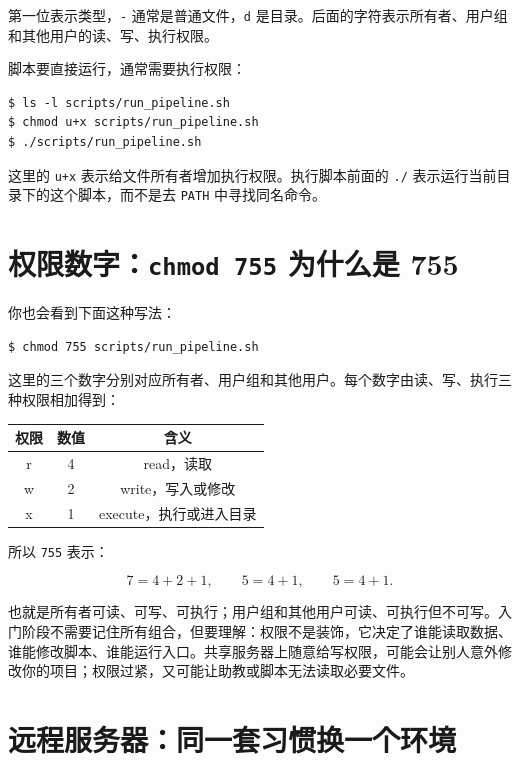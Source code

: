 第一位表示类型，\texttt{-} 通常是普通文件，\texttt{d} 是目录。后面的字符表示所有者、用户组和其他用户的读、写、执行权限。

脚本要直接运行，通常需要执行权限：

\begin{examplebox}[给脚本增加执行权限]
\begin{lstlisting}[style=terminal]
$ ls -l scripts/run_pipeline.sh
$ chmod u+x scripts/run_pipeline.sh
$ ./scripts/run_pipeline.sh
\end{lstlisting}
\end{examplebox}

这里的 \texttt{u+x} 表示给文件所有者增加执行权限。执行脚本前面的 \texttt{./} 表示运行当前目录下的这个脚本，而不是去 \texttt{PATH} 中寻找同名命令。

\section{权限数字：\texttt{chmod 755} 为什么是 755}

你也会看到下面这种写法：

\begin{lstlisting}[style=terminal]
$ chmod 755 scripts/run_pipeline.sh
\end{lstlisting}

这里的三个数字分别对应所有者、用户组和其他用户。每个数字由读、写、执行三种权限相加得到：

\begin{center}
\begin{tabular}{ccc}
\toprule
权限 & 数值 & 含义 \\
\midrule
r & 4 & read，读取 \\
w & 2 & write，写入或修改 \\
x & 1 & execute，执行或进入目录 \\
\bottomrule
\end{tabular}
\end{center}

所以 \texttt{755} 表示：

\[
7=4+2+1,\qquad 5=4+1,\qquad 5=4+1.
\]

也就是所有者可读、可写、可执行；用户组和其他用户可读、可执行但不可写。入门阶段不需要记住所有组合，但要理解：权限不是装饰，它决定了谁能读取数据、谁能修改脚本、谁能运行入口。共享服务器上随意给写权限，可能会让别人意外修改你的项目；权限过紧，又可能让助教或脚本无法读取必要文件。

\section{远程服务器：同一套习惯换一个环境}

